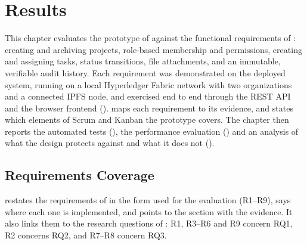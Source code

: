 \chapter{Results}
\label{ch:results}

This chapter evaluates the prototype of  against the functional requirements of : creating and archiving projects, role-based membership and permissions, creating and assigning tasks, status transitions, file attachments, and an immutable, verifiable audit history. Each requirement was demonstrated on the deployed system, running on a local Hyperledger Fabric network with two organizations and a connected IPFS node, and exercised end to end through the REST API and the browser frontend ().  maps each requirement to its evidence, and  states which elements of Scrum and Kanban the prototype covers. The chapter then reports the automated tests (), the performance evaluation () and an analysis of what the design protects against and what it does not ().

\section{Requirements Coverage}
\label{sec:results-requirements}

 restates the requirements of  in the form used for the evaluation (R1--R9), says where each one is implemented, and points to the section with the evidence. It also links them to the research questions of : R1, R3--R6 and R9 concern RQ1, R2 concerns RQ2, and R7--R8 concern RQ3.

